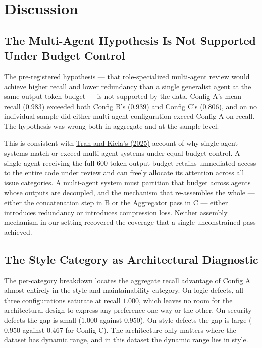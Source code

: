 \documentclass[pdflatex,sn-mathphys-num]{sn-jnl}
\newcommand{\apa}[2]{\hyperlink{cite.#1}{#2}}
\theoremstyle{thmstyleone}
\theoremstyle{thmstyletwo}
\theoremstyle{thmstylethree}
\begin{document}
\section{Discussion}\label{sec:discussion}

\subsection{The Multi-Agent Hypothesis Is Not Supported Under Budget Control}

The pre-registered hypothesis --- that role-specialized multi-agent review would achieve higher recall and lower redundancy than a single generalist agent at the same output-token budget --- is not supported by the data. Config A's mean recall ($0.983$) exceeded both Config B's ($0.939$) and Config C's ($0.806$), and on no individual sample did either multi-agent configuration exceed Config A on recall. The hypothesis was wrong both in aggregate and at the sample level.

This is consistent with \apa{tran2025}{Tran and Kiela's (2025)} account of why single-agent systems match or exceed multi-agent systems under equal-budget control. A single agent receiving the full 600-token output budget retains unmediated access to the entire code under review and can freely allocate its attention across all issue categories. A multi-agent system must partition that budget across agents whose outputs are decoupled, and the mechanism that re-assembles the whole --- either the concatenation step in B or the Aggregator pass in C --- either introduces redundancy or introduces compression loss. Neither assembly mechanism in our setting recovered the coverage that a single unconstrained pass achieved.

\subsection{The Style Category as Architectural Diagnostic}

The per-category breakdown locates the aggregate recall advantage of Config A almost entirely in the style and maintainability category. On logic defects, all three configurations saturate at recall $1.000$, which leaves no room for the architectural design to express any preference one way or the other. On security defects the gap is small ($1.000$ against $0.950$). On style defects the gap is large ($0.950$ against $0.467$ for Config C). The architecture only matters where the dataset has dynamic range, and in this dataset the dynamic range lies in style.
\end{document}
